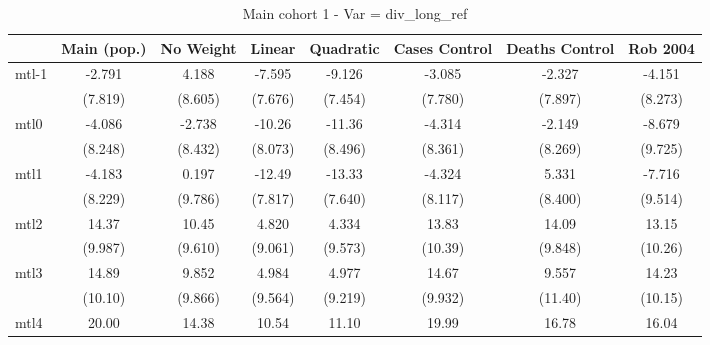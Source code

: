 \documentclass{article}
\begin{document}
{
\def\sym#1{\ifmmode^{#1}\else\(^{#1}\)\fi}
\begin{longtable}{l*{7}{c}}
\caption{Main cohort 1 - Var = div\_long\_ref}\\
\hline\hline\endfirsthead\hline\endhead\hline\endfoot\endlastfoot
                &\multicolumn{1}{c}{Main (pop.)}&\multicolumn{1}{c}{No Weight}&\multicolumn{1}{c}{Linear}&\multicolumn{1}{c}{Quadratic}&\multicolumn{1}{c}{Cases Control}&\multicolumn{1}{c}{Deaths Control}&\multicolumn{1}{c}{Rob 2004}\\
\hline
mtl-1           &   -2.791         &    4.188         &   -7.595         &   -9.126         &   -3.085         &   -2.327         &   -4.151         \\
                &  (7.819)         &  (8.605)         &  (7.676)         &  (7.454)         &  (7.780)         &  (7.897)         &  (8.273)         \\
mtl0            &   -4.086         &   -2.738         &   -10.26         &   -11.36         &   -4.314         &   -2.149         &   -8.679         \\
                &  (8.248)         &  (8.432)         &  (8.073)         &  (8.496)         &  (8.361)         &  (8.269)         &  (9.725)         \\
mtl1            &   -4.183         &    0.197         &   -12.49         &   -13.33         &   -4.324         &    5.331         &   -7.716         \\
                &  (8.229)         &  (9.786)         &  (7.817)         &  (7.640)         &  (8.117)         &  (8.400)         &  (9.514)         \\
mtl2            &    14.37         &    10.45         &    4.820         &    4.334         &    13.83         &    14.09         &    13.15         \\
                &  (9.987)         &  (9.610)         &  (9.061)         &  (9.573)         &  (10.39)         &  (9.848)         &  (10.26)         \\
mtl3            &    14.89         &    9.852         &    4.984         &    4.977         &    14.67         &    9.557         &    14.23         \\
                &  (10.10)         &  (9.866)         &  (9.564)         &  (9.219)         &  (9.932)         &  (11.40)         &  (10.15)         \\
mtl4            &    20.00         &    14.38         &    10.54         &    11.10         &    19.99         &    16.78         &    16.04         \\

\end{longtable}}
\end{document}
